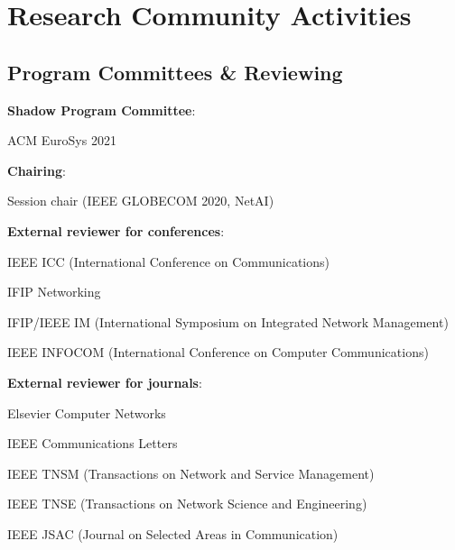 \section{Research Community Activities}
\subsection{Program Committees \& Reviewing}
\begin{cvitemize}
	\item \textbf{Shadow Program Committee}:
	\begin{inlineItemize}
		\item ACM EuroSys 2021
	\end{inlineItemize}
	\item \textbf{Chairing}:
	\begin{inlineItemize}
		\item Session chair (IEEE GLOBECOM 2020, NetAI)
	\end{inlineItemize}
	\item \textbf{External reviewer for conferences}:
	\begin{inlineItemize}
		\item IEEE ICC (International Conference on Communications)
		\item IFIP Networking
		\item IFIP/IEEE IM (International Symposium on Integrated Network Management)
		\item IEEE INFOCOM (International Conference on Computer Communications)
	\end{inlineItemize}
	\item \textbf{External reviewer for journals}:
	\begin{inlineItemize}
		\item Elsevier Computer Networks
		\item IEEE Communications Letters
		\item IEEE TNSM (Transactions on Network and Service Management)
		\item IEEE TNSE (Transactions on Network Science and Engineering)
		\item IEEE JSAC (Journal on Selected Areas in Communication)
	\end{inlineItemize}
\end{cvitemize}

\pagebreak

